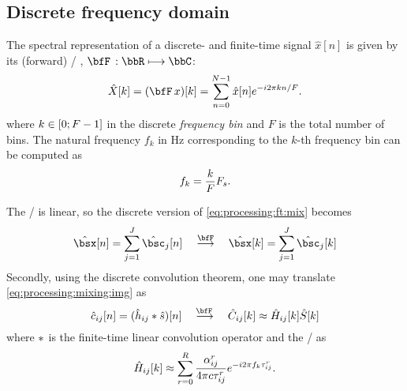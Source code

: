 \subsection{Discrete frequency domain}
The spectral representation of a discrete- and finite-time signal $\hat{x}[n]$ is given by its (forward) \DFTdef/
,
$\discreteFT{}:\bbR\kmapsto\bbC$:
\begin{equation}\label{eq:processing:dft}
    \hat{X}[ k] = (\discreteFT{x})[k] =
    \sum_{n = 0}^{N - 1}
    \hat{x}[ n]
    \cste^{-\csti2\pi k n / F}.
\end{equation}
where $k \in \kintervcc{0}{F - 1}$ in the discrete \textit{frequency bin} and $F$ is the total number of bins.
The natural frequency $f_k$ in $\si{\Hz}$ corresponding to the $k$-th frequency bin can be computed as
\begin{equation}\label{eq:processing:fk}
    f_k = \frac{k}{F}F_s
    .
\end{equation}

\mynewline
The \DFT/ is linear, so the discrete version of \cref{eq:processing:ft:mix} becomes
\begin{equation}\label{eq:processing:dft:mix}
    \hat{\mics}[ n] = \sum_{\idxSrc=1}^{\numSrcs} \hat{\imgs}_\idxSrc[ n]
    \mathspace\overset{\discreteFT}{\kto}\mathspace
    \hat{\mics}[ k] = \sum_{\idxSrc=1}^{\numSrcs} \hat{\imgs}_\idxSrc[ k]
\end{equation}
Secondly, using the discrete convolution theorem, one may translate \cref{eq:processing:mixing:img} as
\begin{equation}\label{eq:processing:discreteModel}
    \hat{\img}_{ij}[n] = (\hat{\rir}_{ij} \convDis \hat{\src})[n]
    \mathspace\overset{\discreteFT{}}{\kto}\mathspace
    \hat{C}_{ij}[k] \approx \hat{H}_{ij}[k] \hat{S}[k]
\end{equation}
where $\ast$ is the finite-time linear convolution operator and the \RIR/ as
\begin{equation}\label{eq:processing:discreteModel:rir}
    \hat{H}_{ij}[ k] \approx \sum_{r=0}^{R}
                \frac{\alpha_{ij}^r}{4 \pi c \tau_{ij}^r}
                {e}^{- {i} 2 \pi f_k \tau_{ij}^r}
    .
\end{equation}

